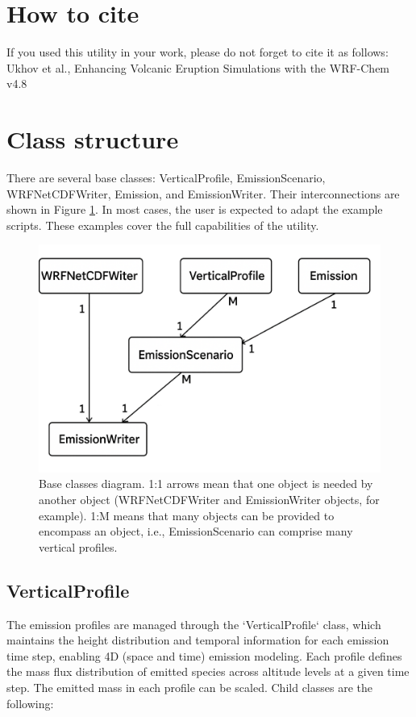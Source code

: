 \documentclass{article}
\begin{document}
\section{How to cite}
If you used this utility in your work, please do not forget to cite it as follows: 
Ukhov et al., Enhancing Volcanic Eruption Simulations with the WRF-Chem v4.8

\clearpage
\section{Class structure}
There are several base classes: VerticalProfile, EmissionScenario, WRFNetCDFWriter, Emission, and EmissionWriter. Their interconnections are shown in Figure \ref{fig1}. In most cases, the user is expected to adapt the example scripts. These examples cover the full capabilities of the utility.

\begin{figure}
    \centering
    \includegraphics[width=0.7\linewidth]{./fig1_diagram.png}
    \caption{Base classes diagram. 1:1 arrows mean that one object is needed by another object (WRFNetCDFWriter and EmissionWriter objects, for example). 1:M means that many objects can be provided to encompass an object, i.e., EmissionScenario can comprise many vertical profiles.}
    \label{fig1}
\end{figure}

\subsection{VerticalProfile}
The emission profiles are managed through the `VerticalProfile` class, which maintains the height distribution and temporal information for each emission time step, enabling 4D (space and time) emission modeling. Each profile defines the mass flux distribution of emitted species across altitude levels at a given time step. The emitted mass in each profile can be scaled. Child classes are the following:
\end{document}
